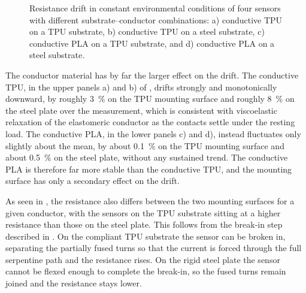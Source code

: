 \begin{figure}[p]
\centering

    \caption{Resistance drift in constant environmental conditions of four sensors with different substrate–conductor combinations: a) conductive TPU on a TPU substrate, b) conductive TPU on a steel substrate, c) conductive PLA on a TPU substrate, and d) conductive PLA on a steel substrate.}
    \label{fig:2by2_drift}
\end{figure}

The conductor material has by far the larger effect on the drift. The conductive TPU, in the upper panels a) and b) of , drifts strongly and monotonically downward, by roughly \SI{3}{\percent} on the TPU mounting surface and roughly \SI{8}{\percent} on the steel plate over the measurement, which is consistent with viscoelastic relaxation of the elastomeric conductor as the contacts settle under the resting load. The conductive PLA, in the lower panels c) and d), instead fluctuates only slightly about the mean, by about \SI{0.1}{\percent} on the TPU mounting surface and about \SI{0.5}{\percent} on the steel plate, without any sustained trend. The conductive PLA is therefore far more stable than the conductive TPU, and the mounting surface has only a secondary effect on the drift.

As seen in , the resistance also differs between the two mounting surfaces for a given conductor, with the sensors on the TPU substrate sitting at a higher resistance than those on the steel plate. This follows from the break-in step described in . On the compliant TPU substrate the sensor can be broken in, separating the partially fused turns so that the current is forced through the full serpentine path and the resistance rises. On the rigid steel plate the sensor cannot be flexed enough to complete the break-in, so the fused turns remain joined and the resistance stays lower.